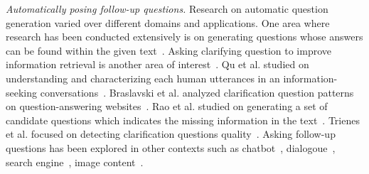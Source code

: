 \noindent
{\em Automatically posing follow-up questions.} Research on automatic question generation varied over different domains and applications. One area where research has been conducted extensively is on generating questions whose answers can be found within the given text~\cite{vanderwende2008importance, rus2011question, zhou2017neural, heilman2010good, duan2017question,  du2017learning}. Asking clarifying question to improve information retrieval is another area of interest~\cite{10.1145/3366423.3380126, 10.1145/3331184.3331265, stoyanchev2014towards}.  Qu et al. studied on understanding and characterizing each human utterances in an information-seeking conversations~\cite{10.1145/3209978.3210124}. Braslavski et al. analyzed clarification question patterns on question-answering websites~\cite{10.1145/3020165.3022149}. Rao et al. studied on generating a set of candidate questions which indicates the missing information in the text~\cite{rao-daume-iii-2018-learning}. Trienes et al. focused on detecting clarification questions quality~\cite{trienes2019identifying}. Asking follow-up questions has been explored in other contexts such as chatbot~\cite{Hancock2019LearningFD}, dialogoue~\cite{de2005implementing, de2003analysis}, search engine~\cite{Ren2020ConversationsWS}, image content~\cite{Mostafazadeh_2016}.
